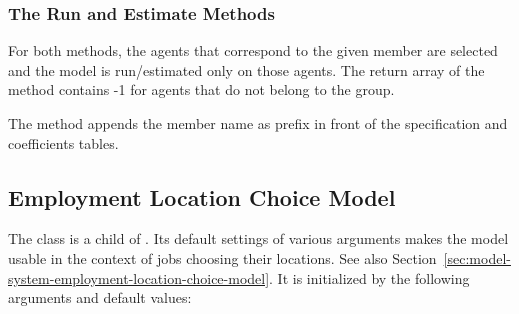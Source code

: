 \subsubsection{The Run and Estimate Methods}
%
For both methods, the agents that correspond to the given member are selected and the model is run/estimated only
on those agents. The return array of the  method contains -1 for agents that do not belong to the group.

The  method appends the member name as prefix in front of the specification and coefficients tables.

\subsection{Employment Location Choice Model}
\label{sec:elcm} 
%
The class   
is a child of . 
Its default settings
of various arguments makes the model usable in the context of jobs choosing their locations. 
See also Section~\ref{sec:model-system-employment-location-choice-model}.
It is initialized by the following arguments and default values:
